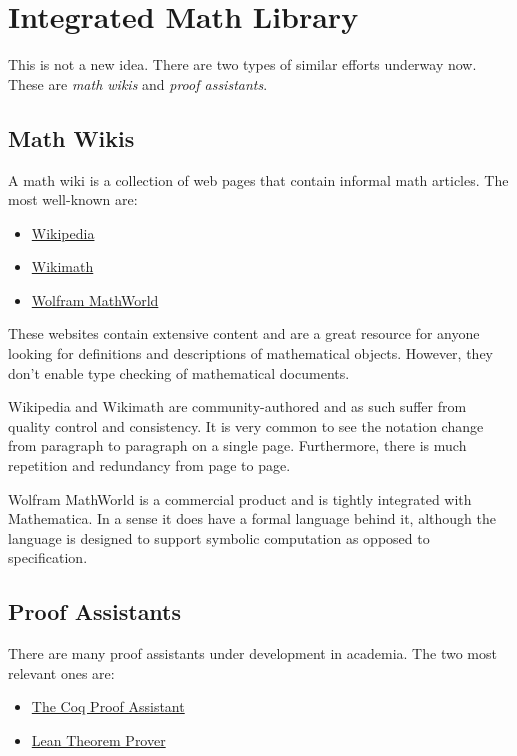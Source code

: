 \documentclass{amsart}
\begin{document}
\hypertarget{integrated-math-library}{}
\section{Integrated Math Library}

This is not a new idea. There are two types of similar efforts underway now.
These are \emph{math wikis} and \emph{proof assistants}.

\subsection{Math Wikis}

A math wiki is a collection of web pages that contain informal math articles.
The most well-known are:
\begin{itemize}
\item \href{https://en.wikipedia.org/wiki/Main_Page}{Wikipedia}
\item \href{https://meta.wikimedia.org/wiki/Wikimath}{Wikimath}
\item \href{https://mathworld.wolfram.com}{Wolfram MathWorld}
\end{itemize}

These websites contain extensive content and are a great resource for anyone looking for definitions and descriptions of
mathematical objects.
However, they don't enable type checking of mathematical documents.

Wikipedia and Wikimath are community-authored and as such suffer from quality control and consistency.
It is very common to see the notation change from paragraph to paragraph on a single page.
Furthermore, there is much repetition and redundancy from page to page.

Wolfram MathWorld is a commercial product and is tightly integrated with Mathematica.
In a sense it does have a formal language behind it, although the language is designed to support symbolic computation
as opposed to specification.

\subsection{Proof Assistants}

There are many proof assistants under development in academia.
The two most relevant ones are:
\begin{itemize}
\item \href{https://coq.inria.fr}{The Coq Proof Assistant}
\item \href{https://leanprover.github.io}{Lean Theorem Prover}
\end{itemize}
\end{document}
